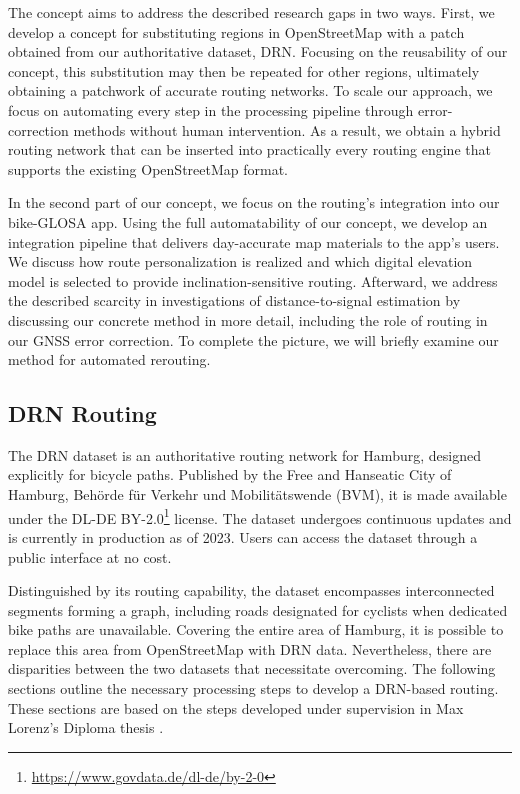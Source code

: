 The concept aims to address the described research gaps in two ways. First, we develop a concept for substituting regions in OpenStreetMap with a patch obtained from our authoritative dataset, DRN. Focusing on the reusability of our concept, this substitution may then be repeated for other regions, ultimately obtaining a patchwork of accurate routing networks. To scale our approach, we focus on automating every step in the processing pipeline through error-correction methods without human intervention. As a result, we obtain a hybrid routing network that can be inserted into practically every routing engine that supports the existing OpenStreetMap format.

In the second part of our concept, we focus on the routing's integration into our bike-GLOSA app. Using the full automatability of our concept, we develop an integration pipeline that delivers day-accurate map materials to the app's users. We discuss how route personalization is realized and which digital elevation model is selected to provide inclination-sensitive routing. Afterward, we address the described scarcity in investigations of distance-to-signal estimation by discussing our concrete method in more detail, including the role of routing in our GNSS error correction. To complete the picture, we will briefly examine our method for automated rerouting.

\subsection{DRN Routing}

The DRN dataset is an authoritative routing network for Hamburg, designed explicitly for bicycle paths. Published by the Free and Hanseatic City of Hamburg, Behörde für Verkehr und Mobilitätswende (BVM), it is made available under the DL-DE BY-2.0\footnote{\url{https://www.govdata.de/dl-de/by-2-0}} license. The dataset undergoes continuous updates and is currently in production as of 2023. Users can access the dataset through a public interface at no cost. 

Distinguished by its routing capability, the dataset encompasses interconnected segments forming a graph, including roads designated for cyclists when dedicated bike paths are unavailable. Covering the entire area of Hamburg, it is possible to replace this area from OpenStreetMap with DRN data. Nevertheless, there are disparities between the two datasets that necessitate overcoming. The following sections outline the necessary processing steps to develop a DRN-based routing. These sections are based on the steps developed under supervision in Max Lorenz's Diploma thesis \cite{lorenz_2022}.


